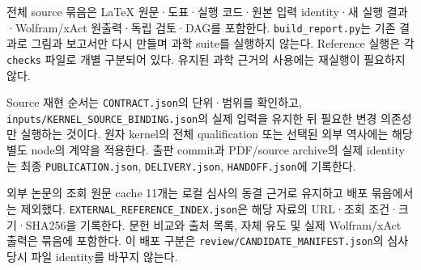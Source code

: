 \documentclass[11pt,a4paper]{article}
\begin{document}
전체 source 묶음은 LaTeX 원문·도표·실행 코드·원본 입력 identity·새 실행 결과·Wolfram/xAct 원출력·독립 검토·DAG를 포함한다. \texttt{build\_report.py}는 기존 결과로 그림과 보고서만 다시 만들며 과학 suite를 실행하지 않는다. Reference 실행은 각 \texttt{checks} 파일로 개별 구분되어 있다. 유지된 과학 근거의 사용에는 재실행이 필요하지 않다.

Source 재현 순서는 \texttt{CONTRACT.json}의 단위·범위를 확인하고, \nolinkurl{inputs/KERNEL_SOURCE_BINDING.json}의 실제 입력을 유지한 뒤 필요한 변경 의존성만 실행하는 것이다. 원자 kernel의 전체 qualification 또는 선택된 외부 역사에는 해당 별도 node의 계약을 적용한다. 출판 commit과 PDF/source archive의 실제 identity는 최종 \texttt{PUBLICATION.json}, \texttt{DELIVERY.json}, \texttt{HANDOFF.json}에 기록한다.

외부 논문의 조회 원문 cache 11개는 로컬 심사의 동결 근거로 유지하고 배포 묶음에서는 제외했다. \nolinkurl{EXTERNAL_REFERENCE_INDEX.json}은 해당 자료의 URL·조회 조건·크기·SHA256을 기록한다. 문헌 비교와 출처 목록, 자체 유도 및 실제 Wolfram/xAct 출력은 묶음에 포함한다. 이 배포 구분은 \nolinkurl{review/CANDIDATE_MANIFEST.json}의 심사 당시 파일 identity를 바꾸지 않는다.
\end{document}
